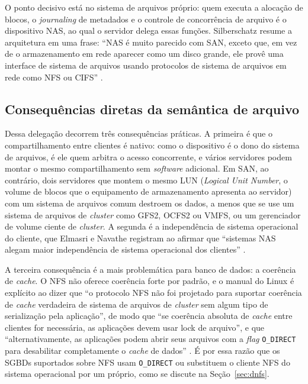 \documentclass[11pt,a4paper]{article}
\begin{document}
O ponto decisivo está no sistema de arquivos próprio: quem executa a alocação de blocos, o
\textit{journaling} de metadados e o controle de concorrência de arquivo é o dispositivo NAS, ao
qual o servidor delega essas funções. Silberschatz resume a arquitetura em uma frase: ``NAS é muito
parecido com SAN, exceto que, em vez de o armazenamento em rede aparecer como um disco grande, ele
provê uma interface de sistema de arquivos usando protocolos de sistema de arquivos em rede como NFS
ou CIFS'' \cite{silberschatz2020}.

\subsection{Consequências diretas da semântica de arquivo}

Dessa delegação decorrem três consequências práticas. A primeira é que o compartilhamento entre
clientes é nativo: como o dispositivo é o dono do sistema de arquivos, é ele quem arbitra o acesso
concorrente, e vários servidores podem montar o mesmo compartilhamento sem \textit{software}
adicional. Em SAN, ao contrário, dois servidores que montem o mesmo LUN (\textit{Logical Unit Number}, o
volume de blocos que o equipamento de armazenamento apresenta ao servidor) com um sistema de
arquivos comum destroem os dados, a menos que se use um sistema de arquivos de \textit{cluster} como
GFS2, OCFS2 ou VMFS, ou um gerenciador de volume ciente de \textit{cluster}. A segunda é a independência
de sistema operacional do cliente, que Elmasri e Navathe registram ao afirmar que ``sistemas NAS
alegam maior independência de sistema operacional dos clientes'' \cite{elmasri2018}.

A terceira consequência é a mais problemática para banco de dados: a coerência de \textit{cache}. O
NFS não oferece coerência forte por padrão, e o manual do Linux é explícito ao dizer que ``o
protocolo NFS não foi projetado para suportar coerência de \textit{cache} verdadeira de sistema de
arquivos de \textit{cluster} sem algum tipo de serialização pela aplicação'', de modo que ``se
coerência absoluta de \textit{cache} entre clientes for necessária, as aplicações devem usar
lock de arquivo'', e que ``alternativamente, as aplicações podem abrir seus arquivos com a
\textit{flag} \texttt{O\_DIRECT} para desabilitar completamente o \textit{cache} de dados''
\cite{nfsman}. É por essa razão que os SGBDs suportados sobre NFS usam \texttt{O\_DIRECT} ou
substituem o cliente NFS do sistema operacional por um próprio, como se discute na
Seção~\ref{sec:dnfs}.
\end{document}
